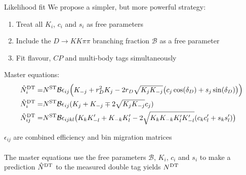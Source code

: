 \documentclass{beamer}
\begin{document}
\begin{frame}{Likelihood fit}
  \vspace{0.0cm}
  {\Large We propose a simpler, but more powerful strategy:}
  \begin{enumerate}
    \item{Treat all $K_i$, $c_i$ and $s_i$ as free parameters}
    \item{Include the $D\to KK\pi\pi$ branching fraction $\mathcal{B}$ as a free parameter}
    \item{Fit flavour, $C\!P$ and multi-body tags simultaneously}
  \end{enumerate}
  \begin{center}
    {\Large Master equations:}
    \begin{align*}
      \hat{N}^{\rm DT}_i =& N^{\rm ST}\mathcal{B}\epsilon_{ij}\Big(K_{-j} + r_D^2K_j - 2r_D\sqrt{K_jK_{-j}}\big(c_j\cos(\delta_D) + s_j\sin(\delta_D)\big)\Big) \\
      \hat{N}^{\rm DT}_i =& N^{\rm ST}\mathcal{B}\epsilon_{ij}(K_j + K_{-j} \mp 2\sqrt{K_jK_{-j}}c_j) \\
      \hat{N}^{\rm DT}_{ij} =& N^{\rm ST}\mathcal{B}\epsilon_{ijkl}\big(K_{k}K_{-l}^\prime + K_{-k}K_{l}^\prime - 2\sqrt{K_{k}K_{-k}K_{l}^\prime K_{-l}^\prime}(c_{k}c_{l}^\prime + s_{k}s_{l}^\prime)\big)
    \end{align*}
  \end{center}
  \begin{center}
    $\epsilon_{ij}$ are combined efficiency and bin migration matrices\\~\\
    {\large The master equations use the free parameters $\mathcal{B}$, $K_i$, $c_i$ and $s_i$ to make a prediction $\hat{N}^{\rm DT}$ to the measured double tag yields $N^{\rm DT}$}
  \end{center}
\end{frame}
\end{document}

